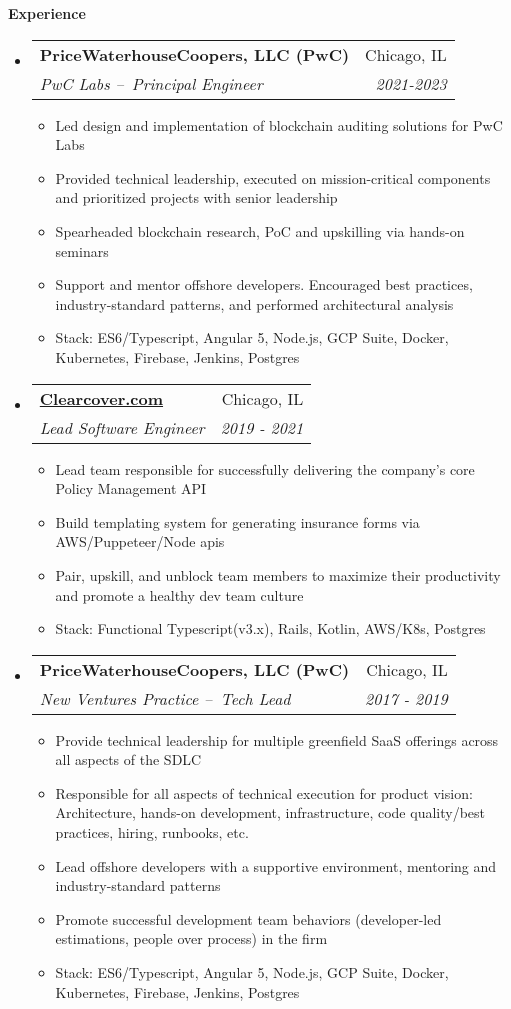 \documentclass[letterpaper,11pt]{article}
\makeatletter
\newcommand{\resitem}[1]{\item #1 \vspace{-3pt}}
\newcommand{\resheading}[1]{{\large {\textbf{#1 \vphantom{p\^{E}}}}}}
\newcommand{\ressubheading}[4]{
	\begin{tabular*}{6.5in}{l@{\extracolsep{\fill}}r}
			\textbf{#1} & #2 \\
			\textit{#3} & \textit{#4} \\
	\end{tabular*}\vspace{-6pt}}
\makeatother
\begin{document}
\resheading{Experience}
\begin{itemize}

\item
  \ressubheading{PriceWaterhouseCoopers, LLC (PwC)}{Chicago, IL}{PwC Labs – Principal Engineer}{2021-2023}
	\begin{itemize}
    \resitem{Led design and implementation of blockchain auditing solutions for PwC Labs}
    \resitem{Provided technical leadership, executed on mission-critical components and prioritized projects with senior leadership}
		\resitem{Spearheaded blockchain research, PoC and upskilling via hands-on seminars}
		\resitem{Support and mentor offshore developers. Encouraged best practices, industry-standard patterns, and performed architectural analysis}
		\resitem{Stack: ES6/Typescript, Angular 5, Node.js, GCP Suite, Docker, Kubernetes, Firebase, Jenkins, Postgres}
	\end{itemize}

\item
  \ressubheading{\href{https://clearcover.com}{Clearcover.com}}{Chicago, IL}{Lead Software Engineer}{2019 - 2021}
	\begin{itemize}
    	\resitem{Lead team responsible for successfully delivering the company's core Policy Management API}
    	\resitem{Build templating system for generating insurance forms via AWS/Puppeteer/Node apis}
		\resitem{Pair, upskill, and unblock team members to maximize their productivity and promote a healthy dev team culture}
		\resitem{Stack: Functional Typescript(v3.x), Rails, Kotlin, AWS/K8s, Postgres}
	\end{itemize}

\item
  \ressubheading{PriceWaterhouseCoopers, LLC (PwC)}{Chicago, IL}{New Ventures Practice – Tech Lead}{2017 - 2019}
	\begin{itemize}
    \resitem{Provide technical leadership for multiple greenfield SaaS offerings across all aspects of the SDLC}
		\resitem{Responsible for all aspects of technical execution for product vision: Architecture, hands-on development, infrastructure, code quality/best practices, hiring, runbooks, etc.}
		\resitem{Lead offshore developers with a supportive environment, mentoring and industry-standard patterns}
		\resitem{Promote successful development team behaviors (developer-led estimations, people over process) in the firm}
		\resitem{Stack: ES6/Typescript, Angular 5, Node.js, GCP Suite, Docker, Kubernetes, Firebase, Jenkins, Postgres}
	\end{itemize}


\end{itemize}
\end{document}
